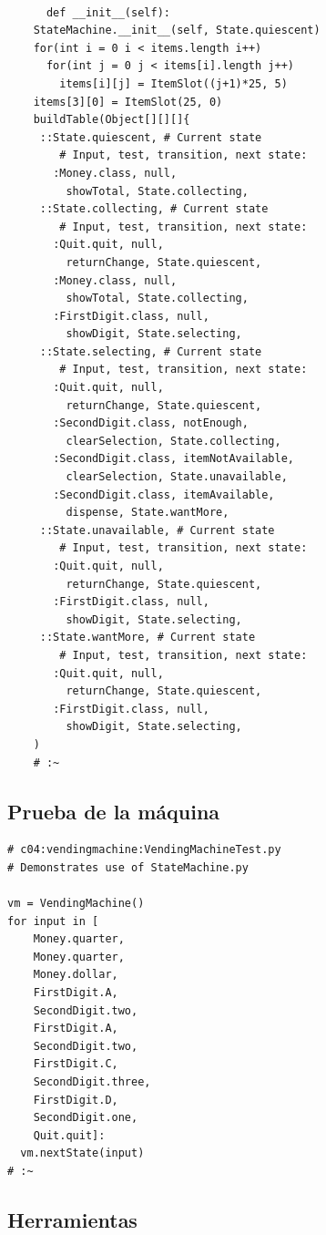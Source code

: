 \documentclass{article}
\begin{document}
\begin{lstlisting}
    
      def __init__(self): 
    StateMachine.__init__(self, State.quiescent) 
    for(int i = 0 i < items.length i++) 
      for(int j = 0 j < items[i].length j++) 
        items[i][j] = ItemSlot((j+1)*25, 5) 
    items[3][0] = ItemSlot(25, 0) 
    buildTable(Object[][][]{ 
     ::State.quiescent, # Current state 
        # Input, test, transition, next state: 
       :Money.class, null,  
         showTotal, State.collecting, 
     ::State.collecting, # Current state 
        # Input, test, transition, next state: 
       :Quit.quit, null,  
         returnChange, State.quiescent, 
       :Money.class, null,  
         showTotal, State.collecting, 
       :FirstDigit.class, null,  
         showDigit, State.selecting, 
     ::State.selecting, # Current state 
        # Input, test, transition, next state: 
       :Quit.quit, null,  
         returnChange, State.quiescent, 
       :SecondDigit.class, notEnough,  
         clearSelection, State.collecting, 
       :SecondDigit.class, itemNotAvailable,  
         clearSelection, State.unavailable, 
       :SecondDigit.class, itemAvailable,  
         dispense, State.wantMore, 
     ::State.unavailable, # Current state 
        # Input, test, transition, next state: 
       :Quit.quit, null,  
         returnChange, State.quiescent, 
       :FirstDigit.class, null,  
         showDigit, State.selecting, 
     ::State.wantMore, # Current state 
        # Input, test, transition, next state: 
       :Quit.quit, null,  
         returnChange, State.quiescent, 
       :FirstDigit.class, null,  
         showDigit, State.selecting, 
    ) 
    # :~ 
\end{lstlisting}

\subsection{Prueba de la máquina}

\begin{lstlisting} 
# c04:vendingmachine:VendingMachineTest.py 
# Demonstrates use of StateMachine.py 

vm = VendingMachine() 
for input in [   
    Money.quarter, 
    Money.quarter, 
    Money.dollar, 
    FirstDigit.A, 
    SecondDigit.two, 
    FirstDigit.A, 
    SecondDigit.two, 
    FirstDigit.C, 
    SecondDigit.three, 
    FirstDigit.D, 
    SecondDigit.one, 
    Quit.quit]: 
  vm.nextState(input) 
# :~ 
\end{lstlisting}

\subsection{Herramientas}
\end{document}
